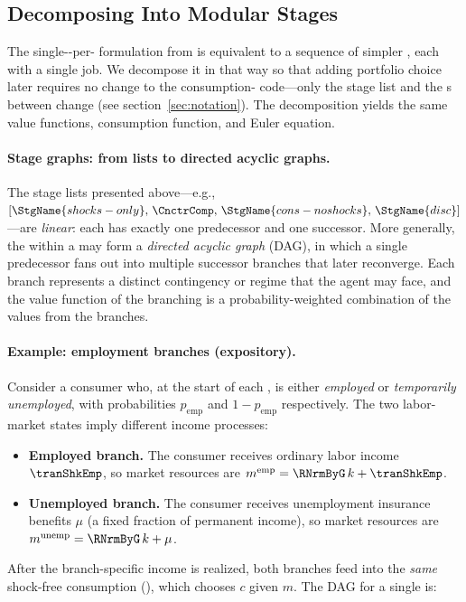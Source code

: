 \documentclass[titlepage, headings=optiontotocandhead]{econark}
\begin{document}
\hypertarget{stages-within-a-period}{}
\subsection{Decomposing Into Modular Stages}\label{subsec:stageswithin}

The single-{\stg}-per-{\interval} formulation from  is equivalent to a sequence of simpler {\stgs}, each with a single job.  We decompose it in that way so that adding portfolio choice later requires no change to the consumption-{\stg} code---only the stage list and the {\Cnct}s between {\stgs} change (see section~\ref{sec:notation}).  The decomposition yields the same value functions, consumption function, and Euler equation.

\paragraph{Stage graphs: from lists to directed acyclic graphs.}
The stage lists presented above---e.g.,
$[\StgName{shocks-only},\, \CnctrComp,\, \StgName{cons-noshocks},\, \StgName{disc}]$---are
\textit{linear}: each {\stg} has exactly one predecessor and one successor.
More generally, the {\stgs} within a {\interval} may form a \textit{directed
acyclic graph} (DAG), in which a single predecessor {\stg} fans out into
multiple successor branches that later reconverge. Each branch represents a
distinct contingency or regime that the agent may face, and the {\Arrival}
value function of the branching {\stg} is a probability-weighted combination
of the {\Arrival} values from the branches.

\paragraph{Example: employment branches (expository).}
Consider a consumer who, at the start of each {\interval}, is either
\textit{employed} or \textit{temporarily unemployed}, with probabilities
$p_{\text{emp}}$ and $1 - p_{\text{emp}}$ respectively. The two labor-market
states imply different income processes:
\begin{itemize}
  \item \textbf{Employed branch.} The consumer receives ordinary labor income
    $\tranShkEmp$, so market resources are
    $m^{\text{emp}} = \RNrmByG\,k + \tranShkEmp$.
  \item \textbf{Unemployed branch.} The consumer receives unemployment
    insurance benefits $\mu$ (a fixed fraction of permanent income), so
    market resources are
    $m^{\text{unemp}} = \RNrmByG\,k + \mu$.
\end{itemize}
After the branch-specific income is realized, both branches feed into the
\textit{same} shock-free consumption {\stg} (),
which chooses $c$ given $m$. The DAG for a single {\interval} is:
\end{document}

